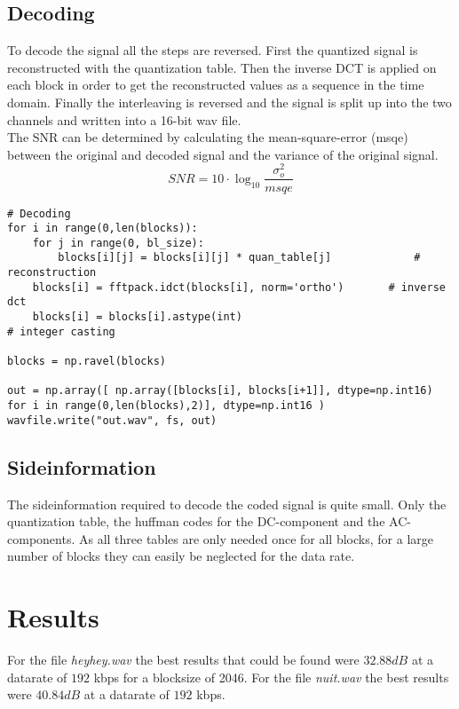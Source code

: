 \documentclass[10pt]{article}
\begin{document}
\subsection{Decoding}
To decode the signal all the steps are reversed.
First the quantized signal is reconstructed with the quantization table.
Then the inverse DCT is applied on each block in order to get the reconstructed values as a sequence in the time domain.
Finally the interleaving is reversed and the signal is split up into the two channels and written into a 16-bit wav file.\\
The SNR can be determined by calculating the mean-square-error (msqe) between the original and decoded signal and the variance of the original signal.
\begin{equation}
	SNR = 10 \cdot \log_{10}{\frac{\sigma_o^2}{msqe}}
\end{equation}

\begin{lstlisting}
# Decoding 
for i in range(0,len(blocks)):
	for j in range(0, bl_size):
		blocks[i][j] = blocks[i][j] * quan_table[j]				# reconstruction
	blocks[i] = fftpack.idct(blocks[i], norm='ortho')		# inverse dct
	blocks[i] = blocks[i].astype(int)										# integer casting

blocks = np.ravel(blocks)

out = np.array([ np.array([blocks[i], blocks[i+1]], dtype=np.int16) for i in range(0,len(blocks),2)], dtype=np.int16 ) 
wavfile.write("out.wav", fs, out)
\end{lstlisting}

\subsection{Sideinformation}
The sideinformation required to decode the coded signal is quite small.
Only the quantization table, the huffman codes for the DC-component and the AC-components.
As all three tables are only needed once for all blocks, for a large number of blocks they can easily be neglected for the data rate.

\section{Results}
For the file \textit{heyhey.wav} the best results that could be found were $32.88 dB$ at a datarate of $192$ kbps for a blocksize of 2046.
For the file \textit{nuit.wav} the best results were $40.84 dB$ at a datarate of $192$ kbps.
\end{document}
